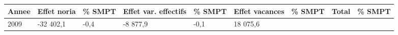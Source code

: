 \begin{longtable}[]{@{}lllllllll@{}}
\toprule
\begin{minipage}[b]{0.05\columnwidth}\raggedright
Annee\strut
\end{minipage} & \begin{minipage}[b]{0.10\columnwidth}\raggedright
Effet noria\strut
\end{minipage} & \begin{minipage}[b]{0.06\columnwidth}\raggedright
\% SMPT\strut
\end{minipage} & \begin{minipage}[b]{0.16\columnwidth}\raggedright
Effet var. effectifs\strut
\end{minipage} & \begin{minipage}[b]{0.06\columnwidth}\raggedright
\% SMPT\strut
\end{minipage} & \begin{minipage}[b]{0.12\columnwidth}\raggedright
Effet vacances\strut
\end{minipage} & \begin{minipage}[b]{0.06\columnwidth}\raggedright
\% SMPT\strut
\end{minipage} & \begin{minipage}[b]{0.09\columnwidth}\raggedright
Total\strut
\end{minipage} & \begin{minipage}[b]{0.06\columnwidth}\raggedright
\% SMPT\strut
\end{minipage}\tabularnewline
\midrule
\endhead
\begin{minipage}[t]{0.05\columnwidth}\raggedright
2009\strut
\end{minipage} & \begin{minipage}[t]{0.10\columnwidth}\raggedright
-32 402,1\strut
\end{minipage} & \begin{minipage}[t]{0.06\columnwidth}\raggedright
-0,4\strut
\end{minipage} & \begin{minipage}[t]{0.16\columnwidth}\raggedright
-8 877,9\strut
\end{minipage} & \begin{minipage}[t]{0.06\columnwidth}\raggedright
-0,1\strut
\end{minipage} & \begin{minipage}[t]{0.12\columnwidth}\raggedright
18 075,6\strut
\end{minipage} & \begin{minipage}[t]{0.06\columnwidth}\raggedright

\end{minipage}
\end{longtable}
